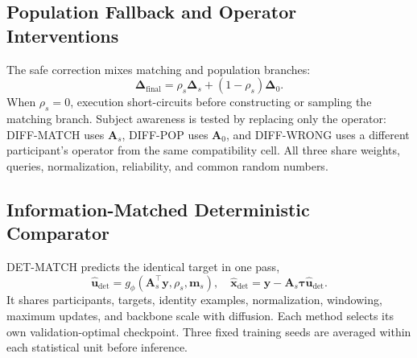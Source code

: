 \subsection{Population Fallback and Operator Interventions}
The safe correction mixes matching and population branches:
\begin{equation}
  \boldsymbol\Delta_{\mathrm{final}}=
  \rho_s\boldsymbol\Delta_s+(1-\rho_s)\boldsymbol\Delta_0.
\end{equation}
When $\rho_s=0$, execution short-circuits before constructing or sampling the
matching branch.  Subject awareness is tested by replacing only the operator:
DIFF-MATCH uses $\mathbf{A}_s$, DIFF-POP uses $\mathbf{A}_0$, and DIFF-WRONG
uses a different participant's operator from the same compatibility cell.  All
three share weights, queries, normalization, reliability, and common random
numbers.

\subsection{Information-Matched Deterministic Comparator}
DET-MATCH predicts the identical target in one pass,
\begin{equation}
  \widehat{\mathbf{u}}_{\mathrm{det}}=
  g_\phi(\mathbf{A}_s^\top\mathbf{y},\rho_s,\mathbf{m}_s),
  \quad
  \widehat{\mathbf{x}}_{\mathrm{det}}=
  \mathbf{y}-\mathbf{A}_s\boldsymbol\tau\widehat{\mathbf{u}}_{\mathrm{det}}.
\end{equation}
It shares participants, targets, identity examples, normalization, windowing,
maximum updates, and backbone scale with diffusion.  Each method selects its own
validation-optimal checkpoint.  Three fixed training seeds are averaged within
each statistical unit before inference.



